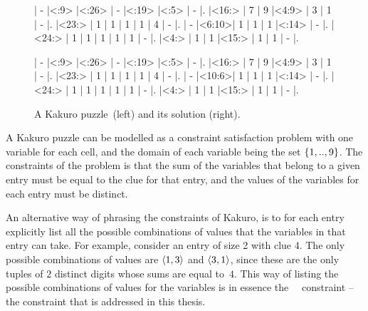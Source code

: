 \documentclass[a4paper,11pt]{article}
\newcommand{\Table}{\Constraint{Table}~}
\numberwithin{equation}{section}
\begin{document}
\begin{figure}
  \centering
  \begin{minipage}{.45\textwidth}
    \begin{Kakuro}{6}{6}
      |  -   |<:9>  |<:26> |  -   |<:19> |<:5>  |  -   |.
      |<16:> |  7   |  9   |<4:9> |  3   |  1   |  -   |.
      |<23:> |  1   |  1   |  1   |  1   |  4   |  -   |.
      |  -   |<6:10>|  1   |  1   |  1   |<:14> |  -   |.
      |<24:> |  1   |  1   |  1   |  1   |  1   |  -   |.
      |<4:>  |  1   |  1   |<15:> |  1   |  1   |  -   |.
    \end{Kakuro}
  \end{minipage}
  \begin{minipage}{.45\textwidth}
    \PuzzleSolution
    \begin{Kakuro}{6}{6}
      |  -   |<:9>  |<:26> |  -   |<:19> |<:5>  |  -   |.
      |<16:> |  7   |  9   |<4:9> |  3   |  1   |  -   |.
      |<23:> |  1   |  1   |  1   |  1   |  4   |  -   |.
      |  -   |<10:6>|  1   |  1   |  1   |<:14> |  -   |.
      |<24:> |  1   |  1   |  1   |  1   |  1   |  -   |.
      |<4:>  |  1   |  1   |<15:> |  1   |  1   |  -   |.
    \end{Kakuro}
  \end{minipage}
  \caption{A Kakuro puzzle~\protect\footnotemark (left) and its solution (right).}
  \label{fig:kakuro}
\end{figure}


A Kakuro puzzle can be modelled as a constraint satisfaction problem with one variable
for each cell, and the domain of each variable being the set $\left\{1,..,9\right\}$.
The constraints of the problem is that the sum of the variables that
belong to a given entry must be equal to the clue for that entry, and the
values of the variables for each entry must be distinct.

An alternative way of phrasing the constraints of Kakuro, is to for each entry
explicitly list all the possible combinations
of values that the variables in that entry can take.
For example, consider an entry of size 2 with clue 4. The only
possible combinations of values are $\left\langle1,3\right\rangle$ and $\left\langle3,1\right\rangle$, since
these are the only tuples of $2$ distinct digits whose sums are 
equal to~$4$. This way of listing the possible combinations of 
values for the variables is in essence the 
\Table~constraint -- the constraint that is
addressed in this thesis.
\end{document}
